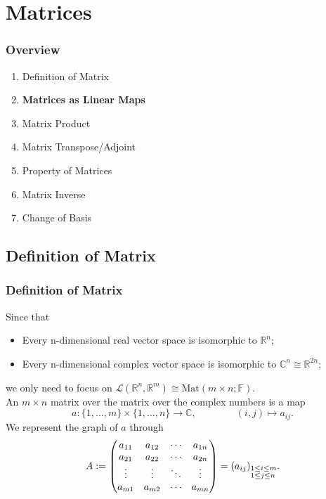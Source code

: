 \documentclass[12pt, t]{beamer}
\newcommand{\C}{\mathbb{C}} \newcommand{\F}{\mathbb{F}} \newcommand{\R}{\mathbb{R}} \newcommand{\Q}{\mathbb{Q}}
\begin{document}
\section{Matrices}
\begin{frame}
    \frametitle{Overview}
    \begin{enumerate}
        \item Definition of Matrix
        \item \textbf{Matrices as Linear Maps}
        \item Matrix Product
        \item Matrix Transpose/Adjoint
        \item Property of Matrices
        \item Matrix Inverse
        \item Change of Basis
    \end{enumerate}
\end{frame}

\subsection{Definition of Matrix}
\begin{frame}
    \frametitle{Definition of Matrix}
    Since that
    \begin{itemize}
        \item Every n-dimensional real vector space is isomorphic to $\R^n$;
        \item Every n-dimensional complex vector space is isomorphic to $\C^n\cong  \R^{2n}$;
    \end{itemize}
    we only need to focus on $\mathcal{L}(\R^n,\R^m)\cong \text{Mat}(m\times n;\F)$.\\
    An $m\times n$ matrix over the matrix over the complex numbers is a map
    \[a:\{1,\ldots,m\}\times\{1,\ldots,n\}\to\C,\qquad\qquad(i,j)\mapsto a_{ij}.\]
    We represent the graph of $a$ through
    \begin{equation*}
        A:=\begin{pmatrix}
            a_{11} & a_{12} & \cdots & a_{1n} \\
            a_{21} & a_{22} & \cdots & a_{2n} \\
            \vdots & \vdots & \ddots & \vdots \\
            a_{m1} & a_{m2} & \cdots & a_{mn}
        \end{pmatrix}=(a_{ij})_{\begin{subarray}~1\leq i\leq m\\ 1\leq j\leq n\end{subarray}}.
    \end{equation*}
\end{frame}
\end{document}
